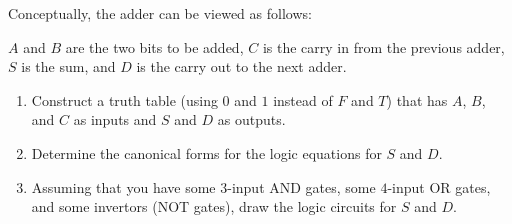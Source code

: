 \documentclass[letterpaper,12pt,fleqn]{article}
\begin{document}
\begin{enumerate}[left=0in,itemsep=0.5in]
  Conceptually, the adder can be viewed as follows:

  \bigskip

  \begin{center}
  \end{center}

  \(A\) and \(B\) are the two bits to be added, \(C\) is the carry in from the previous adder, \(S\) is the sum,
  and \(D\) is the carry out to the next adder.
  \begin{enumerate}
  \item Construct a truth table (using \(0\) and \(1\) instead of \(F\) and \(T\)) that has \(A\), \(B\), and
    \(C\) as inputs and \(S\) and \(D\) as outputs.
  \item Determine the canonical forms for the logic equations for \(S\) and \(D\).
  \item Assuming that you have some \(3\)-input AND gates, some \(4\)-input OR gates, and some invertors (NOT
    gates), draw the logic circuits for \(S\) and \(D\).
  \end{enumerate}
\end{enumerate}
\end{document}
